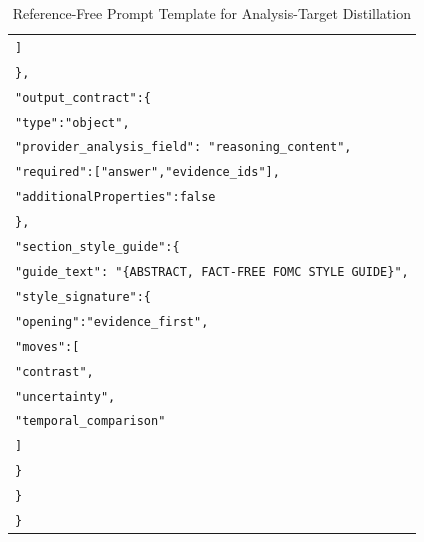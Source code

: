\begin{table}[htbp]
\begin{tabular}{@{}p{}@{}}
        \hspace*{2em}\texttt{]} \\
        \hspace*{1em}\texttt{\},} \\

        \hspace*{1em}\texttt{"output\_contract":\{} \\
        \hspace*{2em}\texttt{"type":"object",} \\
        \hspace*{2em}\texttt{"provider\_analysis\_field":
        "reasoning\_content",} \\
        \hspace*{2em}\texttt{"required":["answer","evidence\_ids"],} \\
        \hspace*{2em}\texttt{"additionalProperties":false} \\
        \hspace*{1em}\texttt{\},} \\

        \hspace*{1em}\texttt{"section\_style\_guide":\{} \\
        \hspace*{2em}\texttt{"guide\_text":
        "\{ABSTRACT, FACT-FREE FOMC STYLE GUIDE\}",} \\
        \hspace*{2em}\texttt{"style\_signature":\{} \\
        \hspace*{3em}\texttt{"opening":"evidence\_first",} \\
        \hspace*{3em}\texttt{"moves":[} \\
        \hspace*{4em}\texttt{"contrast",} \\
        \hspace*{4em}\texttt{"uncertainty",} \\
        \hspace*{4em}\texttt{"temporal\_comparison"} \\
        \hspace*{3em}\texttt{]} \\
        \hspace*{2em}\texttt{\}} \\
        \hspace*{1em}\texttt{\}} \\
        \texttt{\}} \\

        \bottomrule
    \end{tabular}

    \caption{Reference-Free Prompt Template for Analysis-Target Distillation}
    \label{tab:ch2:prompt_for_data_distillation_chk1}
\end{table}



